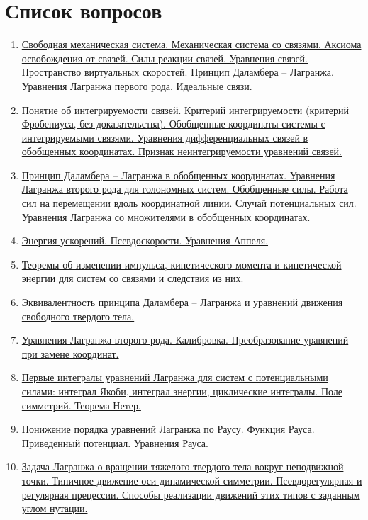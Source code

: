 \documentclass[specialist, subf, href, colorlinks=true, 12pt, times, mtpro, final]{disser}
\theoremstyle{definition}
\def\note{\textcolor{faded}}
\begin{document}
    

    \section*{Список вопросов}
    \begin{enumerate}
    \item \hyperref[1]{Свободная механическая система. Механическая система со связями. Аксиома освобождения от связей. Силы реакции связей. Уравнения связей. Пространство виртуальных скоростей. Принцип Даламбера – Лагранжа. Уравнения Лагранжа первого рода. Идеальные связи.}
    \item \hyperref[2]{Понятие об интегрируемости связей. Критерий интегрируемости (критерий Фробениуса, без доказательства). Обобщенные координаты системы с интегрируемыми связями. Уравнения дифференциальных связей в обобщенных координатах. Признак неинтегрируемости уравнений связей.}
    \item \hyperref[3]{Принцип Даламбера – Лагранжа в обобщенных координатах. Уравнения Лагранжа второго рода для голономных систем. Обобщенные силы. Работа сил на перемещении вдоль координатной линии. Случай потенциальных сил. Уравнения Лагранжа со множителями в обобщенных координатах.}
    \item \hyperref[4]{Энергия ускорений. Псевдоскорости. Уравнения Аппеля.}
    \item \hyperref[5]{Теоремы об изменении импульса, кинетического момента и кинетической энергии для систем со связями и следствия из них.}
    \item \hyperref[6]{Эквивалентность принципа Даламбера – Лагранжа и уравнений движения свободного твердого тела.}
    \item \hyperref[7]{Уравнения Лагранжа второго рода. Калибровка. Преобразование уравнений при замене координат.}
    \item \hyperref[8]{Первые интегралы уравнений Лагранжа для систем с потенциальными силами:
    интеграл Якоби, интеграл энергии, циклические интегралы. Поле симметрий. Теорема Нетер.}
    \item \hyperref[9]{Понижение порядка уравнений Лагранжа по Раусу. Функция Рауса. Приведенный потенциал. Уравнения Рауса.}
    \item \hyperref[10]{Задача Лагранжа о вращении тяжелого твердого тела вокруг неподвижной точки. Типичное движение оси динамической симметрии. Псевдорегулярная и регулярная прецессии. Способы реализации движений этих типов с заданным углом нутации.}

\end{enumerate}
\end{document}
